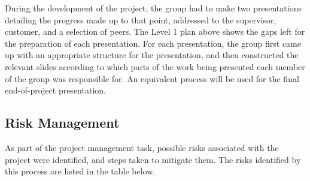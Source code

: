 During the development of the project, the group had to make two presentations
detailing the progress made up to that point, addressed to the supervisor,
customer, and a selection of peers. The Level 1 plan above shows the gaps left
for the preparation of each presentation. For each presentation, the group first
came up with an appropriate structure for the presentation, and then constructed
the relevant slides according to which parts of the work being presented each
member of the group was responsible for. An equivalent process will be used for
the final end-of-project presentation.


\subsection{Risk Management}

As part of the project management task, possible risks associated with the
project were identified, and steps taken to mitigate them. The risks identified
by this process are listed in the table below.

